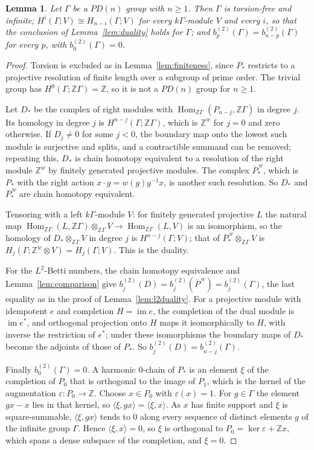 \documentclass[11pt,a4paper]{article}
\newtheorem{lemma}{Lemma}[section]
\theoremstyle{definition}
\theoremstyle{remark}
\newcommand{\Z}{\mathbb{Z}}
\newcommand{\Gam}{\Gamma}
\newcommand{\bt}[1]{b^{(2)}_{#1}}
\newcommand{\Hom}{\operatorname{Hom}}
\begin{document}
\begin{lemma}\label{lem:pd}
Let $\Gam$ be a $PD(n)$ group with $n\ge1$. Then $\Gam$ is torsion-free and infinite;
$H^i(\Gam;V)\cong H_{n-i}(\Gam;V)$ for every $k\Gam$-module $V$ and every $i$, so that
the conclusion of Lemma~\ref{lem:duality} holds for $\Gam$; and
$\bt{p}(\Gam)=\bt{n-p}(\Gam)$ for every $p$, with $\bt{0}(\Gam)=0$.
\end{lemma}
\begin{proof}
Torsion is excluded as in Lemma~\ref{lem:finiteness}, since $P_*$ restricts to a
projective resolution of finite length over a subgroup of prime order. The
trivial group has $H^0(\Gam;\Z\Gam)=\Z$, so it is not a $PD(n)$ group for $n\ge1$.

Let $D_*$ be the complex of right modules with $\Hom_{\Z\Gam}(P_{n-j},\Z\Gam)$ in
degree $j$. Its homology in degree $j$ is $H^{n-j}(\Gam;\Z\Gam)$, which is $\Z^w$ for
$j=0$ and zero otherwise. If $D_j\ne0$ for some $j<0$, the boundary map onto the
lowest such module is surjective and splits, and a contractible summand can be
removed; repeating this, $D_*$ is chain homotopy equivalent to a resolution of the
right module $\Z^w$ by finitely generated projective modules. The complex
$\overline P^{\,w}_*$, which is $P_*$ with the right action $x\cdot g=w(g)g^{-1}x$,
is another such resolution. So $D_*$ and $\overline P^{\,w}_*$ are chain homotopy
equivalent.

Tensoring with a left $k\Gam$-module $V$: for finitely generated projective $L$ the
natural map $\Hom_{\Z\Gam}(L,\Z\Gam)\otimes_{\Z\Gam}V\to\Hom_{\Z\Gam}(L,V)$ is an
isomorphism, so the homology of $D_*\otimes_{\Z\Gam}V$ in degree $j$ is
$H^{n-j}(\Gam;V)$; that of $\overline P^{\,w}_*\otimes_{\Z\Gam}V$ is
$H_j(\Gam;\Z^w\otimes V)=H_j(\Gam;V)$. This is the duality.

For the $L^2$-Betti numbers, the chain homotopy equivalence and
Lemma~\ref{lem:comparison} give $\bt{j}(D)=\bt{j}(\overline P^{\,w})=\bt{j}(\Gam)$,
the last equality as in the proof of Lemma~\ref{lem:l2duality}. For a projective
module with idempotent $e$ and completion $H=\operatorname{im}e$, the completion
of the dual module is $\operatorname{im}e^*$, and orthogonal projection onto $H$
maps it isomorphically to $H$, with inverse the restriction of $e^*$; under these
isomorphisms the boundary maps of $D_*$ become the adjoints of those of $P_*$. So
$\bt{j}(D)=\bt{n-j}(\Gam)$. 

Finally $\bt{0}(\Gam)=0$. A harmonic $0$-chain of $P_*$ is an element $\xi$ of
the completion of $P_0$ that is orthogonal to the image of $P_1$, which is the
kernel of the augmentation $\varepsilon:P_0\to\Z$. Choose $x\in P_0$ with
$\varepsilon(x)=1$. For $g\in\Gam$ the element $gx-x$ lies in that kernel, so
$\langle\xi,gx\rangle=\langle\xi,x\rangle$. As $x$ has finite support and $\xi$
is square-summable, $\langle\xi,gx\rangle$ tends to $0$ along every sequence of
distinct elements $g$ of the infinite group $\Gam$. Hence
$\langle\xi,x\rangle=0$, so $\xi$ is orthogonal to $P_0=\ker\varepsilon+\Z x$,
which spans a dense subspace of the completion, and $\xi=0$.
\end{proof}
\end{document}
